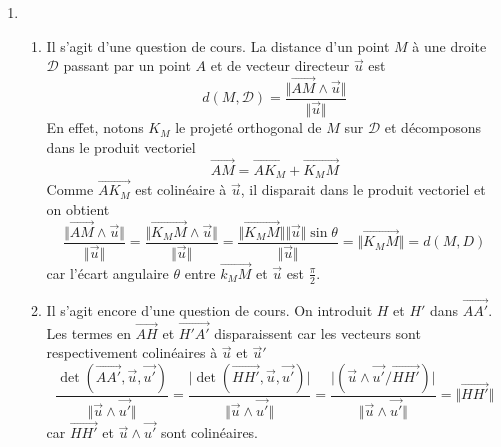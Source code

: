 
\begin{enumerate}
\item \begin{enumerate}
 \item Il s'agit d'une question de cours. La distance d'un point $M$ à une droite $\mathcal D$ passant par un point $A$ et de vecteur directeur $\overrightarrow u$ est 
\begin{displaymath}
 d(M,\mathcal D)=\dfrac{\Vert \overrightarrow{AM}\wedge \overrightarrow u\Vert}{\Vert \overrightarrow u\Vert}
\end{displaymath}
En effet, notons $K_M$ le projeté orthogonal de $M$ sur $\mathcal D$ et décomposons dans le produit vectoriel
\begin{displaymath}
 \overrightarrow{AM}=\overrightarrow{AK_M}+\overrightarrow{K_MM}
\end{displaymath}
Comme $\overrightarrow{AK_M}$ est colinéaire à $\overrightarrow u$, il disparait dans le produit vectoriel et on obtient
\begin{displaymath}
 \dfrac{\Vert \overrightarrow{AM}\wedge \overrightarrow u\Vert}{\Vert \overrightarrow u\Vert}
=\dfrac{\Vert \overrightarrow{K_MM}\wedge \overrightarrow u\Vert}{\Vert \overrightarrow u\Vert}
= \dfrac{\Vert \overrightarrow{K_MM}\Vert \Vert \overrightarrow u\Vert \sin \theta}{\Vert \overrightarrow u\Vert}
= \Vert \overrightarrow{K_MM}\Vert =  d(M, D)
\end{displaymath}
car l'écart angulaire $\theta$ entre $\overrightarrow{k_MM}$ et $\overrightarrow u$ est $\frac{\pi}{2}$.
\item Il s'agit encore d'une question de cours. On introduit $H$ et $H'$ dans $\overrightarrow{AA'}$. Les termes en $\overrightarrow{AH}$ et $\overrightarrow{H'A'}$ disparaissent car les vecteurs sont respectivement colinéaires à $\overrightarrow u$ et $\overrightarrow u'$
\begin{displaymath}
 \dfrac{\det(\overrightarrow{AA'},\overrightarrow u,\overrightarrow{u'})}{\Vert \overrightarrow u \wedge \overrightarrow{u'} \Vert}
=\dfrac{\vert\det(\overrightarrow{HH'},\overrightarrow u,\overrightarrow{u'})\vert}{\Vert \overrightarrow u \wedge \overrightarrow{u'} \Vert}
=\dfrac{\vert(\overrightarrow u \wedge \overrightarrow{u'} / \overrightarrow{HH'})\vert}{\Vert \overrightarrow u \wedge \overrightarrow{u'}\Vert}
= \Vert \overrightarrow{HH'}\Vert
\end{displaymath}
car $\overrightarrow{HH'}$ et $\overrightarrow u \wedge \overrightarrow{u'}$ sont colinéaires.
\end{enumerate}

\end{enumerate}
